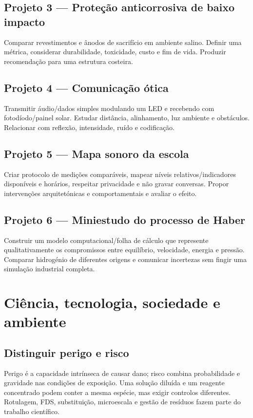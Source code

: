 \documentclass[11pt,a4paper,oneside]{book}
\begin{document}
\section{Projeto 3 — Proteção anticorrosiva de baixo impacto}
Comparar revestimentos e ânodos de sacrifício em ambiente salino. Definir uma métrica, considerar durabilidade, toxicidade, custo e fim de vida. Produzir recomendação para uma estrutura costeira.

\section{Projeto 4 — Comunicação ótica}
Transmitir áudio/dados simples modulando um LED e recebendo com fotodíodo/painel solar. Estudar distância, alinhamento, luz ambiente e obstáculos. Relacionar com reflexão, intensidade, ruído e codificação.

\section{Projeto 5 — Mapa sonoro da escola}
Criar protocolo de medições comparáveis, mapear níveis relativos/indicadores disponíveis e horários, respeitar privacidade e não gravar conversas. Propor intervenções arquitetónicas e comportamentais e avaliar o efeito.

\section{Projeto 6 — Miniestudo do processo de Haber}
Construir um modelo computacional/folha de cálculo que represente qualitativamente os compromissos entre equilíbrio, velocidade, energia e pressão. Comparar hidrogénio de diferentes origens e comunicar incertezas sem fingir uma simulação industrial completa.

\chapter{Ciência, tecnologia, sociedade e ambiente}
\section{Distinguir perigo e risco}
Perigo é a capacidade intrínseca de causar dano; risco combina probabilidade e gravidade nas condições de exposição. Uma solução diluída e um reagente concentrado podem conter a mesma espécie, mas exigir controlos diferentes. Rotulagem, FDS, substituição, microescala e gestão de resíduos fazem parte do trabalho científico.
\end{document}
